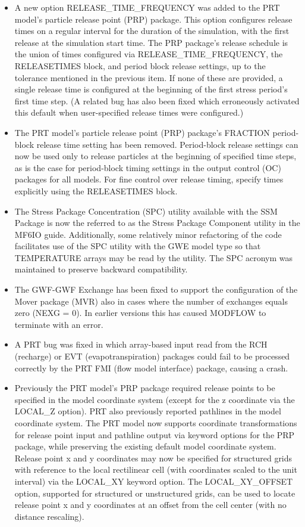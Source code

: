 \begin{itemize}
		\item A new option RELEASE\_TIME\_FREQUENCY was added to the PRT model's particle release point (PRP) package. This option configures release times on a regular interval for the duration of the simulation, with the first release at the simulation start time. The PRP package's release schedule is the union of times configured via RELEASE\_TIME\_FREQUENCY, the RELEASETIMES block, and period block release settings, up to the tolerance mentioned in the previous item. If none of these are provided, a single release time is configured at the beginning of the first stress period's first time step. (A related bug has also been fixed which erroneously activated this default when user-specified release times were configured.)
		\item The PRT model's particle release point (PRP) package's FRACTION period-block release time setting has been removed. Period-block release settings can now be used only to release particles at the beginning of specified time steps, as is the case for period-block timing settings in the output control (OC) packages for all models. For fine control over release timing, specify times explicitly using the RELEASETIMES block.
		\item The Stress Package Concentration (SPC) utility available with the SSM Package is now the referred to as the Stress Package Component utility in the MF6IO guide.  Additionally, some relatively minor refactoring of the code facilitates use of the SPC utility with the GWE model type so that TEMPERATURE arrays may be read by the utility.  The SPC acronym was maintained to preserve backward compatibility.
		\item The GWF-GWF Exchange has been fixed to support the configuration of the Mover package (MVR) also in cases where the number of exchanges equals zero (NEXG = 0). In earlier versions this has caused MODFLOW to terminate with an error.
		\item A PRT bug was fixed in which array-based input read from the RCH (recharge) or EVT (evapotranspiration) packages could fail to be processed correctly by the PRT FMI (flow model interface) package, causing a crash.
		\item Previously the PRT model's PRP package required release points to be specified in the model coordinate system (except for the z coordinate via the LOCAL\_Z option). PRT also previously reported pathlines in the model coordinate system. The PRT model now supports coordinate transformations for release point input and pathline output via keyword options for the PRP package, while preserving the existing default model coordinate system. Release point x and y coordinates may now be specified for structured grids with reference to the local rectilinear cell (with coordinates scaled to the unit interval) via the LOCAL\_XY keyword option. The LOCAL\_XY\_OFFSET option, supported for structured or unstructured grids, can be used to locate release point x and y coordinates at an offset from the cell center (with no distance rescaling).
	\end{itemize}

